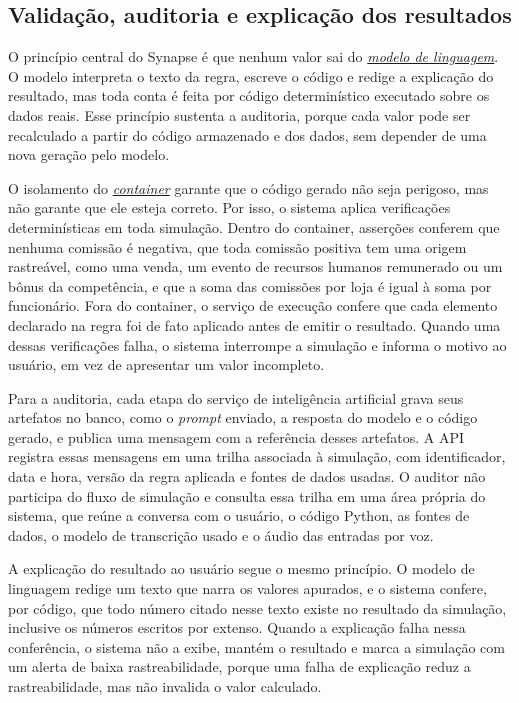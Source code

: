 \documentclass[12pt,a4paper]{article}
\newcommand{\termo}[2]{\hyperlink{gls:#1}{\textit{#2}}}
\begin{document}
\subsection{Validação, auditoria e explicação dos resultados}

O princípio central do Synapse é que nenhum valor sai do \termo{modelo}{modelo de linguagem}. O modelo interpreta o texto da regra, escreve o código e redige a explicação do resultado, mas toda conta é feita por código determinístico executado sobre os dados reais. Esse princípio sustenta a auditoria, porque cada valor pode ser recalculado a partir do código armazenado e dos dados, sem depender de uma nova geração pelo modelo.

O isolamento do \termo{container}{container} garante que o código gerado não seja perigoso, mas não garante que ele esteja correto. Por isso, o sistema aplica verificações determinísticas em toda simulação. Dentro do container, asserções conferem que nenhuma comissão é negativa, que toda comissão positiva tem uma origem rastreável, como uma venda, um evento de recursos humanos remunerado ou um bônus da competência, e que a soma das comissões por loja é igual à soma por funcionário. Fora do container, o serviço de execução confere que cada elemento declarado na regra foi de fato aplicado antes de emitir o resultado. Quando uma dessas verificações falha, o sistema interrompe a simulação e informa o motivo ao usuário, em vez de apresentar um valor incompleto.

Para a auditoria, cada etapa do serviço de inteligência artificial grava seus artefatos no banco, como o \textit{prompt} enviado, a resposta do modelo e o código gerado, e publica uma mensagem com a referência desses artefatos. A API registra essas mensagens em uma trilha associada à simulação, com identificador, data e hora, versão da regra aplicada e fontes de dados usadas. O auditor não participa do fluxo de simulação e consulta essa trilha em uma área própria do sistema, que reúne a conversa com o usuário, o código Python, as fontes de dados, o modelo de transcrição usado e o áudio das entradas por voz.

A explicação do resultado ao usuário segue o mesmo princípio. O modelo de linguagem redige um texto que narra os valores apurados, e o sistema confere, por código, que todo número citado nesse texto existe no resultado da simulação, inclusive os números escritos por extenso. Quando a explicação falha nessa conferência, o sistema não a exibe, mantém o resultado e marca a simulação com um alerta de baixa rastreabilidade, porque uma falha de explicação reduz a rastreabilidade, mas não invalida o valor calculado.
\end{document}
